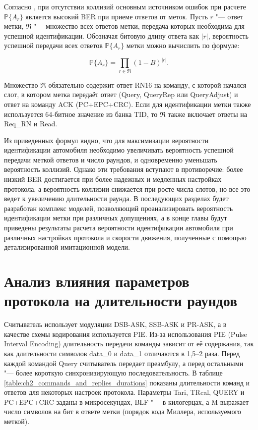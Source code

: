 Согласно \cite{Nikitin2008}, при отсутствии коллизий основным источником ошибок при расчете $\mathbb{P}\{A_r\}$ является высокий BER при приеме ответов от меток. Пусть $r$ "--- ответ метки, $\mathfrak{R}$ "--- множество всех ответов метки, передача которых необходима для успешной идентификации. Обозначая битовую длину ответа как $|r|$, вероятность успешной передачи всех ответов $\mathbb{P}\{A_r\}$ метки можно вычислить по формуле:

$$
	\mathbb{P}\{A_r\}=\prod_{r \in \mathfrak{R}}(1-B)^{|r|}.
$$

Множество $\mathfrak{R}$ обязательно содержит ответ RN16 на команду, с которой начался слот, в котором метка передаёт ответ (Query, QueryRep или QueryAdjust) и ответ на команду ACK (PC+EPC+CRC). Если для идентификации метки также используется 64-битное значение из банка TID, то $\mathfrak{R}$ также включает ответы на Req\_RN и Read.

Из приведенных формул видно, что для максимизации вероятности идентификации автомобиля необходимо увеличивать вероятность успешной передачи меткой ответов и число раундов, и одновременно уменьшать вероятность коллизий. Однако эти требования вступают в противоречие: более низкий BER достигается при более надежных и медленных настройках протокола, а вероятность коллизии снижается при росте числа слотов, но все это ведет к увеличению длительности раунда. В последующих разделах будет разработан комплекс моделей, позволяющий проанализировать вероятность идентификации метки при различных допущениях, а в конце главы будут приведены результаты расчета вероятности идентификации автомобиля при различных настройках протокола и скорости движения, полученные с помощью детализированной имитационной модели.







\section{Анализ влияния параметров протокола на длительности раундов}\label{sec:ch2_durations}
Считыватель использует модуляции DSB-ASK, SSB-ASK и PR-ASK, а в качестве схемы кодирования используется PIE. Из-за использования PIE (Pulse Interval Encoding) длительность передачи команды зависит от её содержания, так как длительности символов data\_0 и data\_1 отличаются в 1,5--2 раза. Перед каждой командой Query считыватель передает преамбулу, а перед остальными "--- более короткую синхронизирующую последовательность. В таблице \ref{table:ch2_commands_and_replies_durations} показаны длительности команд и ответов для некоторых настроек протокола. Параметры Tari, TRcal, QUERY и PC+EPC+CRC заданы в микросекундах, BLF "--- в килогерцах, а M выражает число символов на бит в ответе метки (порядок кода Миллера, используемого меткой).

